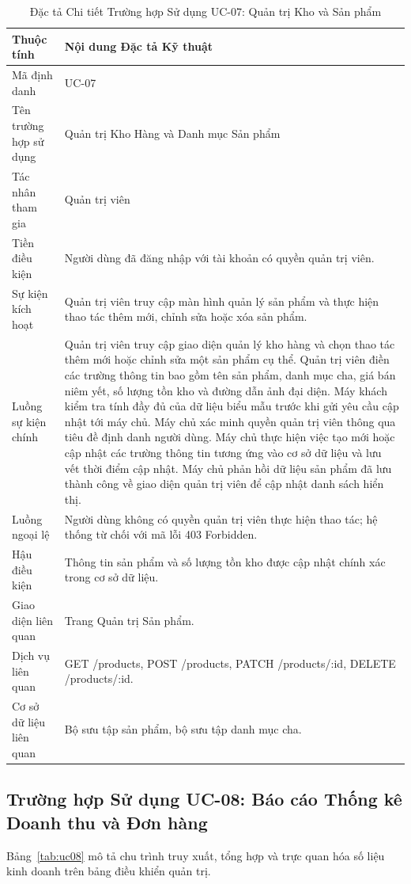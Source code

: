 \begin{table}[H]
\centering
\caption{Đặc tả Chi tiết Trường hợp Sử dụng UC-07: Quản trị Kho và Sản phẩm}
\label{tab:uc07}
\begin{tabularx}{\textwidth}{p{3.5cm}X}
\toprule
\textbf{Thuộc tính} & \textbf{Nội dung Đặc tả Kỹ thuật} \\
\midrule
Mã định danh & UC-07 \\
Tên trường hợp sử dụng & Quản trị Kho Hàng và Danh mục Sản phẩm \\
Tác nhân tham gia & Quản trị viên \\
Tiền điều kiện & Người dùng đã đăng nhập với tài khoản có quyền quản trị viên. \\
Sự kiện kích hoạt & Quản trị viên truy cập màn hình quản lý sản phẩm và thực hiện thao tác thêm mới, chỉnh sửa hoặc xóa sản phẩm. \\
Luồng sự kiện chính & 
Quản trị viên truy cập giao diện quản lý kho hàng và chọn thao tác thêm mới hoặc chỉnh sửa một sản phẩm cụ thể.
Quản trị viên điền các trường thông tin bao gồm tên sản phẩm, danh mục cha, giá bán niêm yết, số lượng tồn kho và đường dẫn ảnh đại diện.
Máy khách kiểm tra tính đầy đủ của dữ liệu biểu mẫu trước khi gửi yêu cầu cập nhật tới máy chủ.
Máy chủ xác minh quyền quản trị viên thông qua tiêu đề định danh người dùng.
Máy chủ thực hiện việc tạo mới hoặc cập nhật các trường thông tin tương ứng vào cơ sở dữ liệu và lưu vết thời điểm cập nhật.
Máy chủ phản hồi dữ liệu sản phẩm đã lưu thành công về giao diện quản trị viên để cập nhật danh sách hiển thị. \\
Luồng ngoại lệ & Người dùng không có quyền quản trị viên thực hiện thao tác; hệ thống từ chối với mã lỗi 403 Forbidden. \\
Hậu điều kiện & Thông tin sản phẩm và số lượng tồn kho được cập nhật chính xác trong cơ sở dữ liệu. \\
Giao diện liên quan & Trang Quản trị Sản phẩm. \\
Dịch vụ liên quan & GET /products, POST /products, PATCH /products/:id, DELETE /products/:id. \\
Cơ sở dữ liệu liên quan & Bộ sưu tập sản phẩm, bộ sưu tập danh mục cha. \\
\bottomrule
\end{tabularx}
\end{table}

\subsection{Trường hợp Sử dụng UC-08: Báo cáo Thống kê Doanh thu và Đơn hàng}
Bảng~\ref{tab:uc08} mô tả chu trình truy xuất, tổng hợp và trực quan hóa số liệu kinh doanh trên bảng điều khiển quản trị.

